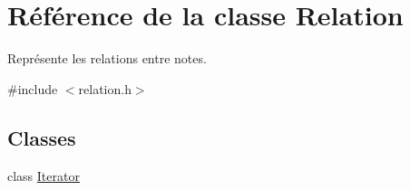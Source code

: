 \hypertarget{class_relation}{\section{Référence de la classe Relation}
\label{class_relation}
}


Représente les relations entre notes.  




{\ttfamily \#include $<$relation.\-h$>$}

\subsection*{Classes}
\begin{DoxyCompactItemize}
\item 
class \hyperlink{class_relation_1_1_iterator}{Iterator}
\end{DoxyCompactItemize}
